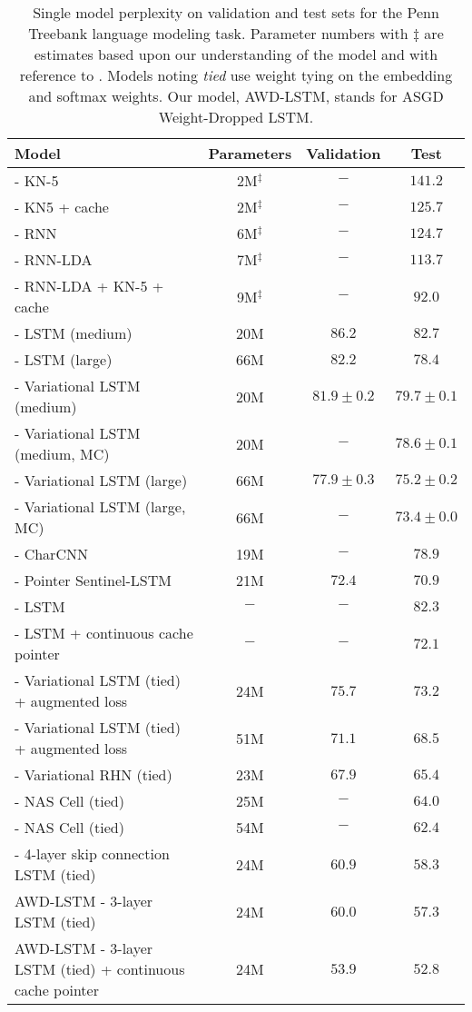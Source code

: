 \documentclass{article}
\begin{document}
\begin{table*}
\center
\begin{tabular}{l|ccc}
\toprule
\bf Model & \bf Parameters & \bf Validation &  \bf Test \\
\midrule
\citet{Mikolov2012} - KN-5 & 2M$^\ddagger$ & $-$ & $141.2$ \\
\citet{Mikolov2012} - KN5 + cache & 2M$^\ddagger$ & $-$ & $125.7$ \\
\citet{Mikolov2012} - RNN & 6M$^\ddagger$ & $-$ & $124.7$ \\
\citet{Mikolov2012} - RNN-LDA & 7M$^\ddagger$ & $-$ & $113.7$ \\
\citet{Mikolov2012} - RNN-LDA + KN-5 + cache & 9M$^\ddagger$ & $-$ & $92.0$ \\
\citet{Zaremba2014} - LSTM (medium) & 20M & $86.2$ & $82.7$ \\
\citet{Zaremba2014} - LSTM (large) & 66M & $82.2$ & $78.4$ \\
\citet{Gal2016ATG} - Variational LSTM (medium) & 20M & $81.9 \pm 0.2$ & $79.7 \pm 0.1$ \\
\citet{Gal2016ATG} - Variational LSTM (medium, MC) & 20M & $-$ & $78.6 \pm 0.1$ \\
\citet{Gal2016ATG} - Variational LSTM (large) & 66M & $77.9 \pm 0.3$ & $75.2 \pm 0.2$ \\
\citet{Gal2016ATG} - Variational LSTM (large, MC) & 66M & $-$ & $73.4 \pm 0.0$ \\
\citet{Kim2016} - CharCNN & 19M & $-$ & $78.9$ \\
\citet{Merity2016} - Pointer Sentinel-LSTM & 21M & $72.4$ & $70.9$ \\
\citet{Grave2016} - LSTM & $-$ & $-$ & $82.3$ \\
\citet{Grave2016} - LSTM + continuous cache pointer & $-$ & $-$ & $72.1$ \\
\citet{Inan2016} - Variational LSTM (tied) + augmented loss & 24M & $75.7$ & $73.2$ \\
\citet{Inan2016} - Variational LSTM (tied) + augmented loss & 51M & $71.1$ & $68.5$ \\
\citet{Zilly2016} - Variational RHN (tied) & 23M & $67.9$ & $65.4$ \\
\citet{Zoph2016} - NAS Cell (tied) & 25M & $-$ & $64.0$ \\
\citet{Zoph2016} - NAS Cell (tied) & 54M & $-$ & $62.4$ \\
\citet{Melis2017} - 4-layer skip connection LSTM (tied) & 24M & $60.9$ & $58.3$ \\
\midrule
AWD-LSTM - 3-layer LSTM (tied) & 24M & $60.0$ & $57.3$ \\
\midrule
AWD-LSTM - 3-layer LSTM (tied) + continuous cache pointer & 24M & $53.9$ & $52.8$ \\
\bottomrule
\end{tabular}
\caption{
Single model perplexity on validation and test sets for the Penn Treebank language modeling task.
Parameter numbers with $\ddagger$ are estimates based upon our understanding of the model and with reference to \citet{Merity2016}.
Models noting \textit{tied} use weight tying on the embedding and softmax weights.
Our model, AWD-LSTM, stands for ASGD Weight-Dropped LSTM.
}
\label{table:PTBresults}
\end{table*}
\end{document}
